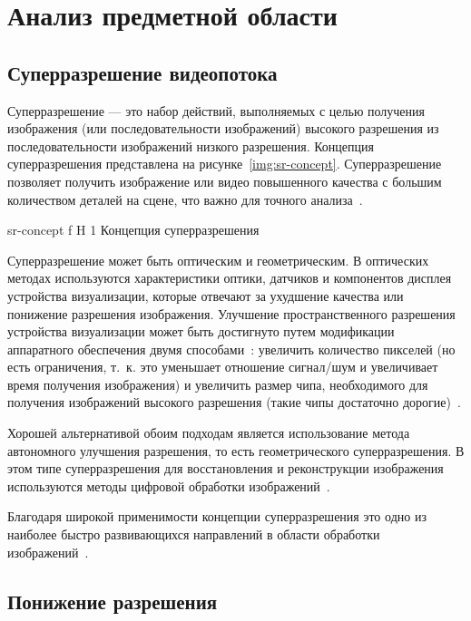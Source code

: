 \documentclass{bmstu}
\begin{document}
\chapter{Анализ предметной области}

\section{Суперразрешение видеопотока}

Суперразрешение --- это набор действий, выполняемых с целью получения изображения (или последовательности изображений) высокого разрешения из последовательности изображений низкого разрешения. 
Концепция суперразрешения представлена на рисунке~\ref{img:sr-concept}. 
Суперразрешение позволяет получить изображение или видео повышенного качества с большим количеством деталей на сцене, что важно для точного анализа~\cite{Daithankar2021}. 

    {sr-concept}
    {f}
    {H}
    {1\textwidth}
    {Концепция суперразрешения~\cite{Daithankar2021}}

Суперразрешение может быть оптическим и геометрическим. 
В оптических методах используются характеристики оптики, датчиков и компонентов дисплея устройства визуализации, которые отвечают за ухудшение качества или понижение разрешения изображения. 
Улучшение пространственного разрешения устройства визуализации может быть достигнуто путем модификации аппаратного обеспечения двумя способами~\cite{Daithankar2021}: увеличить количество пикселей (но есть ограничения, т.~к. это уменьшает отношение сигнал/шум и увеличивает время получения изображения) и увеличить размер чипа, необходимого для получения изображений высокого разрешения (такие чипы достаточно дорогие)~\cite{Park2003}.

Хорошей альтернативой обоим подходам является использование метода автономного улучшения разрешения, то есть геометрического суперразрешения. 
В этом типе суперразрешения для восстановления и реконструкции изображения используются методы цифровой обработки изображений~\cite{Daithankar2021}.

Благодаря широкой применимости концепции суперразрешения это одно из наиболее быстро развивающихся направлений в области обработки изображений~\cite{Yue2016}.

\section{Понижение разрешения}
\end{document}
